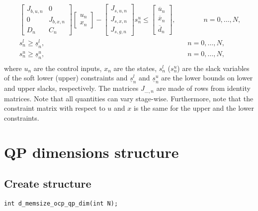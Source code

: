\documentclass[a4paper]{report}
\begin{document}
\begin{align*}
& \quad \begin{bmatrix} J_{b,u,n} & 0 \\ 0 & J_{b,x,n} \\ D_n & C_n \end{bmatrix} \begin{bmatrix} u_n \\ x_n \end{bmatrix} - \begin{bmatrix} J_{s,u,n} \\ J_{s,x,n} \\ J_{s,g,n} \end{bmatrix} s^u_n \leq \begin{bmatrix} \overline u_n \\ \overline x_n \\ \overline d_n \end{bmatrix} , \qquad \qquad n=0,\dots,N, & & \\
& \quad s^l_n\geq \underline{s}^l_n, \qquad \qquad \qquad \qquad \qquad \qquad \qquad \qquad \qquad \qquad \,\,\,  n=0,\dots,N, & &\\
& \quad s^u_n\geq \underline{s}^u_n, \qquad \qquad \qquad \qquad \qquad \qquad \qquad \qquad \qquad \qquad \,\,\,  n=0,\dots,N, & &\\
\end{align*}
where $u_n$ are the control inputs, $x_n$ are the states, $s^l_n$ ($s^u_n$) are the slack variables of the soft lower (upper) constraints
and $\underline{s}^l_n$ and $\underline{s}^u_n$ are the lower bounds on lower and upper slacks, respectively.
The matrices $J_{\dots,n}$ are made of rows from identity matrices.
Note that all quantities can vary stage-wise.
Furthermore, note that the constraint matrix with respect to $u$ and $x$ is the same for the upper and the lower constraints.

\section{QP dimensions structure}

\subsection{Create structure}

\begin{verbatim}
int d_memsize_ocp_qp_dim(int N);
\end{verbatim}
\end{document}
